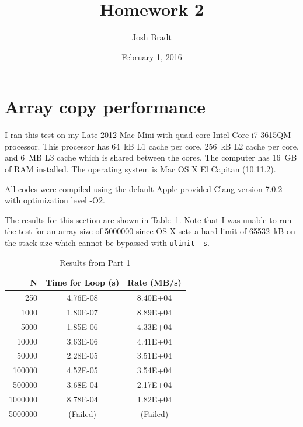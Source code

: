 \documentclass{article}
\title{Homework 2}
\author{Josh Bradt}
\date{February 1, 2016}
\begin{document}
\maketitle

\section{Array copy performance}

I ran this test on my Late-2012 Mac Mini with quad-core Intel Core i7-3615QM processor. This processor has \SI{64}{kB} L1 cache per core, \SI{256}{kB} L2 cache per core, and \SI{6}{MB} L3 cache which is shared between the cores. The computer has \SI{16}{GB} of RAM installed. The operating system is Mac OS X El Capitan (10.11.2).

All codes were compiled using the default Apple-provided Clang version 7.0.2 with optimization level -O2.

The results for this section are shown in Table~\ref{tab:part1}. Note that I was unable to run the test for an array size of \num{5000000} since OS X sets a hard limit of \SI{65532}{kB} on the stack size which cannot be bypassed with \texttt{ulimit -s}.

\begin{table}[b]
\centering
\begin{tabular}{@{}rcc@{}}
\toprule
N         & Time for Loop (s) & Rate (MB/s) \\ \midrule
\num{250}       & \num{4.76E-08}          & \num{8.40E+04}    \\
\num{1000}     & \num{1.80E-07}          & \num{8.89E+04}    \\
\num{5000}     & \num{1.85E-06}          & \num{4.33E+04}    \\
\num{10000}    & \num{3.63E-06}          & \num{4.41E+04}    \\
\num{50000}    & \num{2.28E-05}          & \num{3.51E+04}    \\
\num{100000}   & \num{4.52E-05}          & \num{3.54E+04}    \\
\num{500000}   & \num{3.68E-04}          & \num{2.17E+04}    \\
\num{1000000} & \num{8.78E-04}          & \num{1.82E+04}    \\
\num{5000000} & (Failed)          & (Failed)    \\ \bottomrule
\end{tabular}
\caption{Results from Part 1}
\label{tab:part1}
\end{table}
\end{document}
